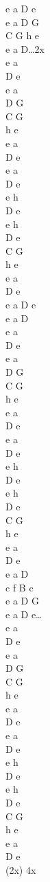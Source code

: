 \begin{chord}
\vin e a D e\\
\vin e a D G\\
\vin C G h e\\
\vin e a D…2x\\
e a\\
D e\\
e a\\
D G\\
C G\\
h e\\
e a\\
D e\\
e a\\
D e\\

e h\\
D e\\
e h\\
D e\\
C G\\
h e\\
e a\\
D e\\
e a D e\\
e a D\\

e a\\
D e\\
e a\\
D G\\
C G\\
h e\\
e a\\
D e\\
e a\\
D e\\

e h\\
D e\\
e h\\
D e\\
C G\\
h e\\
e a\\
D e\\
e a D\\
c f B c\\
e a D G \\
e a D e…\\

e a\\
D e\\
e a\\
D G\\
C G\\
h e\\
e a\\
D e\\
e a\\
D e\\

e h\\
D e\\
e h\\
D e\\
C G\\
h e\\
e a\\
D e\\
(2x)
4x\\
\end{chord}
